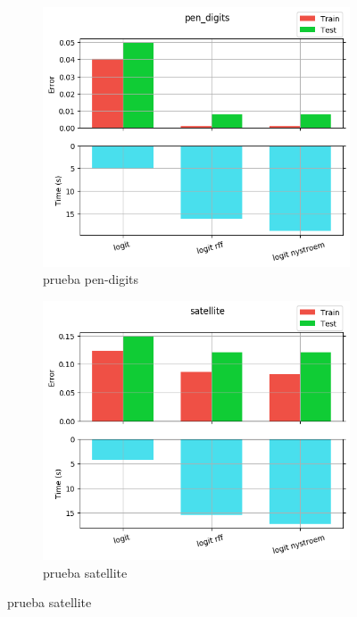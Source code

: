\begin{figure}[ht]
  \centering
  \begin{subfigure}[b]{0.5\linewidth}
    \centering\includegraphics[width=\imgscale\linewidth]{Figures/2_1/pen_digits}
    \caption{prueba pen-digits}
    \label{fig:2_1_pen_digits}
  \end{subfigure}%
  \begin{subfigure}[b]{0.5\linewidth}
    \centering\includegraphics[width=\imgscale\linewidth]{Figures/2_1/satellite}
    \caption{prueba satellite}
    \label{fig:2_1_satellite}
  \end{subfigure}
\end{figure}

